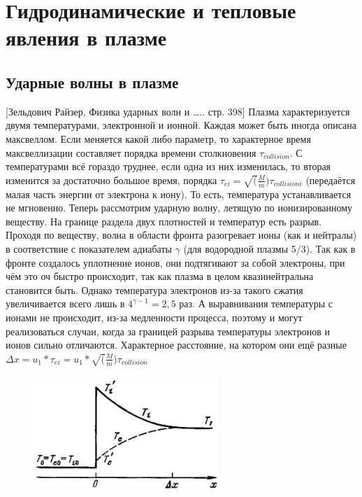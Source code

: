 \documentclass[10pt, a4paper]{article}
\let\stdsection\section
\renewcommand\section{\newpage\stdsection}
\begin{document}
\section{ Гидродинамические и тепловые явления в плазме}

\subsection{Ударные волны в плазме}

[Зельдович Райзер, Физика ударных волн и ….. стр. 398]
Плазма характеризуется двумя температурами, электронной и ионной. Каждая может быть иногда описана максвеллом. Если меняется какой либо параметр, то характерное время максвеллизации составляет порядка времени столкновения $\tau_{collision}$. С температурами всё гораздо труднее, если одна из них изменилась, то вторая изменится за достаточно большое время, порядка $\tau_{ei}=\sqrt(\frac{M}{m}) \tau_{collision i}$ (передаётся малая часть энергии от электрона к иону). То есть, температура устанавливается не мгновенно.
Теперь рассмотрим ударную волну, летящую по ионизированному веществу.
На границе раздела двух плотностей и температур есть разрыв. Проходя по веществу, волна в области фронта разогревает ионы (как и нейтралы) в соответствие с показателем адиабаты $\gamma$ (для водородной плазмы 5/3). Так как в фронте создалось уплотнение ионов, они подтягивают за собой электроны, при чём это оч быстро происходит, так как плазма в целом квазинейтральна становится быть. Однако температура электронов из-за такого сжатия увеличивается всего лишь в $4^{\gamma - 1}=2,5$ раз. А выравнивания температуры с ионами не происходит, из-за медленности процесса, поэтому и могут реализоваться случаи, когда за границей разрыва температуры электронов и ионов сильно отличаются. Характерное расстояние, на котором они ещё разные $\Delta x = u_1*\tau_{ei} =u_1* \sqrt(\frac{M}{m}) \tau_{collision}$

\begin{figure}[ht]
	\begin{center}
		\includegraphics[width=70mm]{13. Skach plotn.JPG}
	\end{center}
\end{figure}
\end{document}

